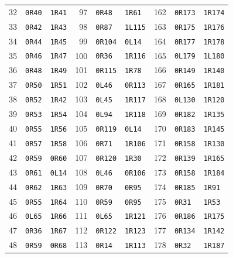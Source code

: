 \begin{longtable}{@{}rll@{\hspace{20pt}}rll@{\hspace{20pt}}rll@{}}
32 & \texttt{0R40} & \texttt{1R41} & 97 & \texttt{0R48} & \texttt{1R61} & 162 & \texttt{0R173} & \texttt{1R174}\\
33 & \texttt{0R42} & \texttt{1R43} & 98 & \texttt{0R87} & \texttt{1L115} & 163 & \texttt{0R175} & \texttt{1R176}\\
34 & \texttt{0R44} & \texttt{1R45} & 99 & \texttt{0R104} & \texttt{0L14} & 164 & \texttt{0R177} & \texttt{1R178}\\
35 & \texttt{0R46} & \texttt{1R47} & 100 & \texttt{0R36} & \texttt{1R116} & 165 & \texttt{0L179} & \texttt{1L180}\\
36 & \texttt{0R48} & \texttt{1R49} & 101 & \texttt{0R115} & \texttt{1R78} & 166 & \texttt{0R149} & \texttt{1R140}\\
37 & \texttt{0R50} & \texttt{1R51} & 102 & \texttt{0L46} & \texttt{0R113} & 167 & \texttt{0R165} & \texttt{1R181}\\
38 & \texttt{0R52} & \texttt{1R42} & 103 & \texttt{0L45} & \texttt{1R117} & 168 & \texttt{0L130} & \texttt{1R120}\\
39 & \texttt{0R53} & \texttt{1R54} & 104 & \texttt{0L94} & \texttt{1R118} & 169 & \texttt{0R182} & \texttt{1R135}\\
40 & \texttt{0R55} & \texttt{1R56} & 105 & \texttt{0R119} & \texttt{0L14} & 170 & \texttt{0R183} & \texttt{1R145}\\
41 & \texttt{0R57} & \texttt{1R58} & 106 & \texttt{0R71} & \texttt{1R106} & 171 & \texttt{0R158} & \texttt{1R130}\\
42 & \texttt{0R59} & \texttt{0R60} & 107 & \texttt{0R120} & \texttt{1R30} & 172 & \texttt{0R139} & \texttt{1R165}\\
43 & \texttt{0R61} & \texttt{0L14} & 108 & \texttt{0L46} & \texttt{0R106} & 173 & \texttt{0R158} & \texttt{1R184}\\
44 & \texttt{0R62} & \texttt{1R63} & 109 & \texttt{0R70} & \texttt{0R95} & 174 & \texttt{0R185} & \texttt{1R91}\\
45 & \texttt{0R55} & \texttt{1R64} & 110 & \texttt{0R59} & \texttt{0R95} & 175 & \texttt{0R31} & \texttt{1R53}\\
46 & \texttt{0L65} & \texttt{1R66} & 111 & \texttt{0L65} & \texttt{1R121} & 176 & \texttt{0R186} & \texttt{1R175}\\
47 & \texttt{0R36} & \texttt{1R67} & 112 & \texttt{0R122} & \texttt{1R123} & 177 & \texttt{0R134} & \texttt{1R142}\\
48 & \texttt{0R59} & \texttt{0R68} & 113 & \texttt{0R14} & \texttt{1R113} & 178 & \texttt{0R32} & \texttt{1R187}\\

\end{longtable}
